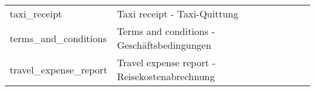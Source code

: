\begin{longtable}[h]{|l|p{9cm}|}
 taxi\_receipt                            &  Taxi receipt - Taxi-Quittung                                                                      \\
 terms\_and\_conditions                   &  Terms and conditions -  Gesch\"{a}ftsbedingungen                                                \\
 travel\_expense\_report                  &  Travel expense report - Reisekostenabrechnung     \\             \hline                          
\end{longtable}

%
